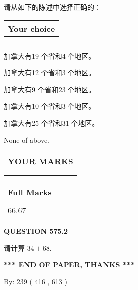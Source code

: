 \documentclass{ctexart}
\begin{document}
  
请从如下的陈述中选择正确的：
  
  
\noindent\hspace{3.0in} \begin{tabular}{|l|}
\hline
Your choice \\
\hline
 \\ 
 \\ 
\hline
\end{tabular}
  
  
 
 
加拿大有19 个省和4 个地区。
 
 
加拿大有12 个省和3 个地区。
 
 
加拿大有9 个省和23 个地区。
 
 
加拿大有10 个省和3 个地区。
 
 
加拿大有25 个省和31 个地区。
 
 
 None of above.
 
 
  
\vspace{0.2in}
  
\noindent\begin{tabular}{|l|}
\hline
 YOUR MARKS  \\
\hline
 \\ 
 \\ 
\hline
\end{tabular}
\hspace{0.05in} \begin{tabular}{|l|}
\hline
 Full Marks  \\
\hline
 \\ 
66.67 \\
\hline
\end{tabular}
{\textbf{\Large{QUESTION
575.2 
}}}
  
  
 
请计算 $ %
34 +  %
68 $.
 

 

 
   
   
 \vspace{0.2in}
 
   
   
   
   
\vspace{1.0in} 
{\textbf{\large{ *** END OF PAPER, THANKS *** }}} 
   
   
\hspace{1.0in} By: 
 239 ( 416 ,  613 )
   
\end{document}
